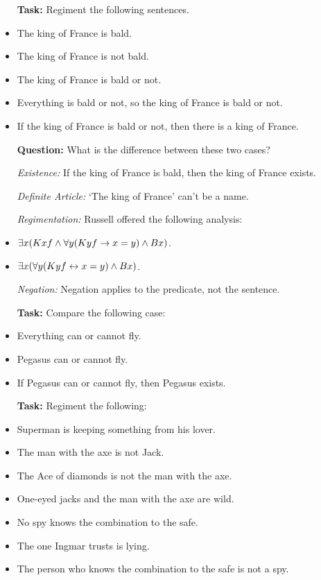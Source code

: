 \documentclass[a4paper, 11pt]{article} %
\begin{document}
\begin{itemize}
  \item[\bf Task:] Regiment the following sentences.
    \item The king of France is bald.
    \item The king of France is not bald.
    \item The king of France is bald or not.
    \item Everything is bald or not, so the king of France is bald or not.
    \item If the king of France is bald or not, then there is a king of France.
  \item[\bf Question:] What is the difference between these two cases?
  \item[\it Existence:] If the king of France is bald, then the king of France exists.
  \item[\it Definite Article:] `The king of France' can't be a name.
  \item[\it Regimentation:] Russell offered the following analysis:
    \item $\exists x(Kxf \wedge \forall y(Kyf \rightarrow x=y) \wedge Bx)$.
    \item $\exists x(\forall y(Kyf \leftrightarrow x=y) \wedge Bx)$.
  \item[\it Negation:] Negation applies to the predicate, not the sentence.
  \item[\bf Task:] Compare the following case:
    \item Everything can or cannot fly.
    \item Pegasus can or cannot fly.
    \item If Pegasus can or cannot fly, then Pegasus exists.
  \item[\bf Task:] Regiment the following:
  \item Superman is keeping something from his lover.
  \item The man with the axe is not Jack.
  \item The Ace of diamonds is not the man with the axe.
  \item One-eyed jacks and the man with the axe are wild.
  \item No spy knows the combination to the safe.
  \item The one Ingmar trusts is lying.
  \item The person who knows the combination to the safe is not a spy.
\end{itemize}
\end{document}
